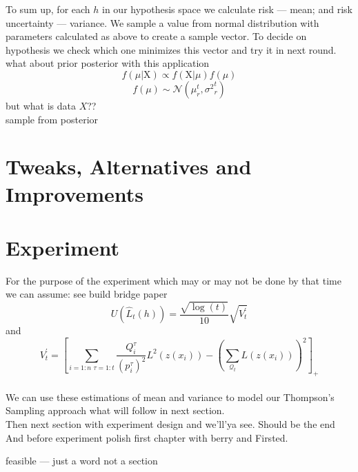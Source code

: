 \documentclass[12pt, a4paper, pdflatex, leqno]{report}
\begin{document}
To sum up, for each $h$ in our hypothesis space we calculate risk --- mean; and risk uncertainty --- variance. We sample a value from normal distribution with parameters calculated as above to create a sample vector. To decide on hypothesis we check which one minimizes this vector and try it in next round.\\

what about prior posterior with this application\\
$$
f \left( \mu | \mathrm{X} \right) \propto f \left( \mathrm{X} | \mu \right) f \left( \mu \right)
$$
$$
f \left( \mu \right) \sim \mathcal{N} \left( \mu_r^t, {\sigma^2}_r^t \right)
$$
but what is data $X$??\\
sample from posterior\\

\section{Tweaks, Alternatives and Improvements\label{sec:qimprove}}

\lipsum[1]

\section{Experiment}

For the purpose of the experiment which may or may not be done by that time we can assume: see build bridge paper
$$
U(\hat{L}_t(h)) = \frac{ \sqrt{ \log(t) } }
                       { 10 }
                  \sqrt{ V^\prime_t }
$$
and
$$
V^\prime_t = \left[
  \sum_{i = 1:n \text{~} \tau = 1:t} \frac{Q^\tau_i}{(p^\tau_i)^2} L^2(z(x_i))
  -
  \left( \sum_{\mathscr{Q}_t} L(z(x_i)) \right)^2
\right]_+
$$~\\


We can use these estimations of mean and variance to model our Thompson's Sampling approach what will follow in next section.\\

Then next section with experiment design and we'll'ya see. Should be the end \\

And before experiment polish first chapter with berry and Firsted.


feasible --- just a word not a section


\end{document}
